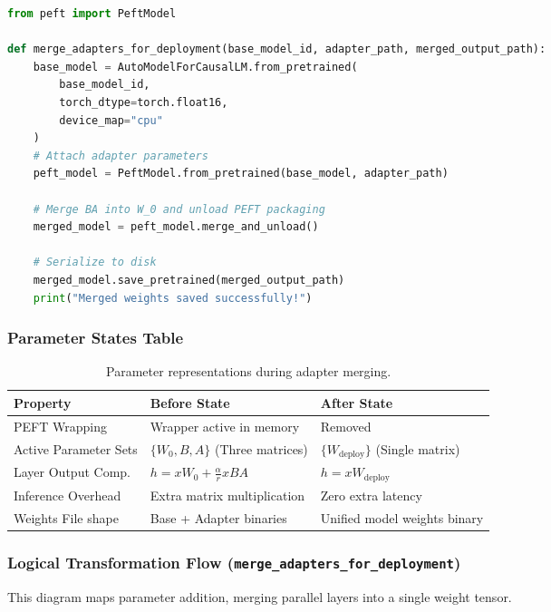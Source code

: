 \documentclass{article}
\begin{document}
\begin{lstlisting}[language=Python]
from peft import PeftModel

def merge_adapters_for_deployment(base_model_id, adapter_path, merged_output_path):
    base_model = AutoModelForCausalLM.from_pretrained(
        base_model_id,
        torch_dtype=torch.float16,
        device_map="cpu"
    )
    # Attach adapter parameters
    peft_model = PeftModel.from_pretrained(base_model, adapter_path)
    
    # Merge BA into W_0 and unload PEFT packaging
    merged_model = peft_model.merge_and_unload()
    
    # Serialize to disk
    merged_model.save_pretrained(merged_output_path)
    print("Merged weights saved successfully!")
\end{lstlisting}

\subsubsection{Parameter States Table}
\begin{table}[h]
\centering
\begin{tabular}{lll}
\toprule
\textbf{Property} & \textbf{Before State} & \textbf{After State} \\
\midrule
PEFT Wrapping & Wrapper active in memory & Removed \\
Active Parameter Sets & $\{W_0, B, A\}$ (Three matrices) & $\{W_{\text{deploy}}\}$ (Single matrix) \\
Layer Output Comp. & $h = xW_0 + \frac{\alpha}{r}xBA$ & $h = xW_{\text{deploy}}$ \\
Inference Overhead & Extra matrix multiplication & Zero extra latency \\
Weights File shape & Base + Adapter binaries & Unified model weights binary \\
\bottomrule
\end{tabular}
\caption{Parameter representations during adapter merging.}
\end{table}

\newpage
\subsubsection{Logical Transformation Flow (\texttt{merge\_adapters\_for\_deployment})}
This diagram maps parameter addition, merging parallel layers into a single weight tensor.
\end{document}

